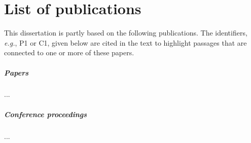 
\chapter*{List of publications}

This dissertation is partly based on the following publications. The identifiers, \textit{e.g.}, P1 or C1, given below are cited in the text to highlight passages that are connected to one or more of these papers.

\paragraph{Papers}
\begin{enumerate}[P1]
...

\end{enumerate}

\paragraph{Conference proceedings}
\begin{enumerate}[C1]
...

\end{enumerate}
